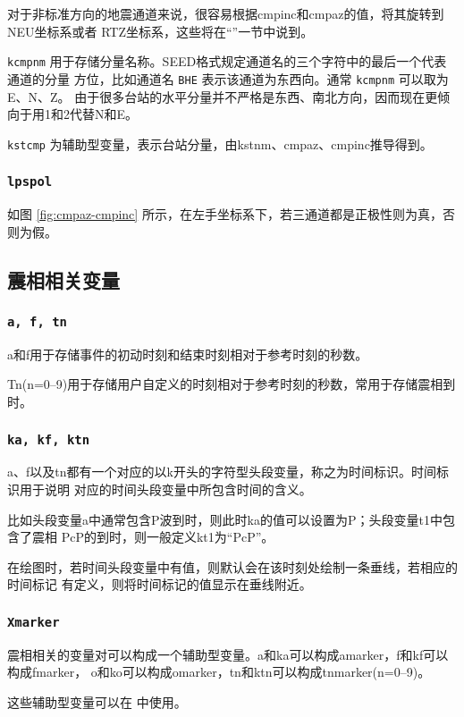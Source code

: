 对于非标准方向的地震通道来说，很容易根据cmpinc和cmpaz的值，将其旋转到NEU坐标系或者
RTZ坐标系，这些将在``''一节中说到。

\texttt{kcmpnm} 用于存储分量名称。SEED格式规定通道名的三个字符中的最后一个代表通道的分量
方位，比如通道名 \texttt{BHE} 表示该通道为东西向。通常 \texttt{kcmpnm} 可以取为E、N、Z。
由于很多台站的水平分量并不严格是东西、南北方向，因而现在更倾向于用1和2代替N和E。

\texttt{kstcmp} 为辅助型变量，表示台站分量，由kstnm、cmpaz、cmpinc推导得到。

\subsubsection{\texttt{lpspol}}
如图 \ref{fig:cmpaz-cmpinc} 所示，在左手坐标系下，若三通道都是正极性则为真，否则为假。

\subsection{震相相关变量}
\subsubsection{\texttt{a, f, tn}}
a和f用于存储事件的初动时刻和结束时刻相对于参考时刻的秒数。

Tn(n=0--9)用于存储用户自定义的时刻相对于参考时刻的秒数，常用于存储震相到时。

\subsubsection{\texttt{ka, kf, ktn}}
a、f以及tn都有一个对应的以k开头的字符型头段变量，称之为时间标识。时间标识用于说明
对应的时间头段变量中所包含时间的含义。

比如头段变量a中通常包含P波到时，则此时ka的值可以设置为P；头段变量t1中包含了震相
PcP的到时，则一般定义kt1为``PcP''。

在绘图时，若时间头段变量中有值，则默认会在该时刻处绘制一条垂线，若相应的时间标记
有定义，则将时间标记的值显示在垂线附近。

\subsubsection{\texttt{Xmarker}}
震相相关的变量对可以构成一个辅助型变量。a和ka可以构成amarker，f和kf可以构成fmarker，
o和ko可以构成omarker，tn和ktn可以构成tnmarker(n=0--9)。

这些辅助型变量可以在  中使用。

